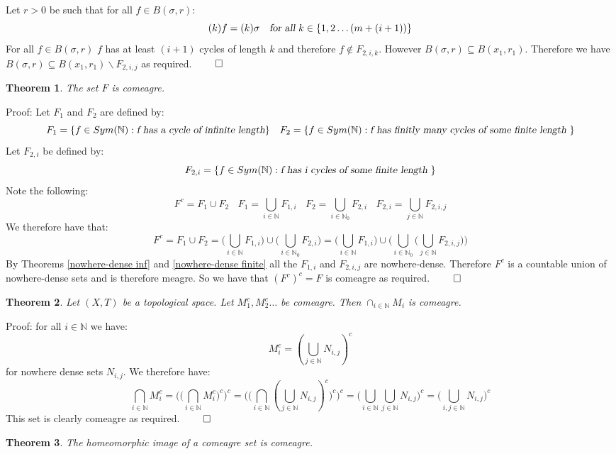 \documentclass{report}
\newtheorem{theorem}{Theorem}[section]
\begin{document}
Let $r>0$ be such that for all $f \in B(\sigma, r)$:
$$(k)f=(k)\sigma\ \ \textsl{ for all } k \in \{1,2\ldots (m+(i+1))\}$$
For all $f\in B(\sigma, r)$ $f$ has at least $(i+1)$ cycles of length $k$ and therefore $f\notin F_{2,i,k}$. However $B(\sigma, r) \subseteq B(x_1,r_1)$.
Therefore we have $B(\sigma,r)\subseteq B(x_1,r_1)\backslash F_{2,i,j}$ as required. $\qed$
\begin{theorem}\label{F is comeagre}
The set $F$ is comeagre.
\end{theorem}\par
Proof: Let $F_1$ and $F_2$ are defined by:
\[F_1 = \{f \in Sym(\mathbb{N}): \textsl{f has a cycle of infinite length}\}\ \ \ F_2 = \{f \in Sym(\mathbb{N}): \textsl{f has finitly many cycles of some finite length }\}\]
Let $F_{2,i}$ be defined by:
$$F_{2,i} = \{f \in Sym(\mathbb{N}): \textsl{f has i cycles of some finite length }\}$$
Note the following:
\[F^c = F_1 \cup F_2 \ \ \ \ F_1 = \bigcup_{i \in \mathbb{N}}F_{1,i}\ \ \ \ F_2 = \bigcup_{i \in \mathbb{N}_0}F_{2,i}\ \ \ \ F_{2,i}=\bigcup_{j \in \mathbb{N}}F_{2,i,j}\]
We therefore have that:
\[F^c = F_1 \cup F_2= \big(\bigcup_{i \in \mathbb{N}}F_{1,i}\big) \cup \big(\bigcup_{i \in \mathbb{N}_0}F_{2,i}\big)= \big(\bigcup_{i \in \mathbb{N}}F_{1,i}\big) \cup \big(\bigcup_{i \in \mathbb{N}_0}\big( \bigcup_{j \in \mathbb{N}}F_{2,i,j} \big)\big)\]
By Theorems \ref{nowhere-dense inf} and \ref{nowhere-dense finite} all the $F_{1,i}$ and $F_{2,i,j}$ are nowhere-dense. Therefore $F^c$ is a countable union of nowhere-dense sets and is therefore meagre. So we have that $(F^c)^c = F$ is comeagre as required.
$\qed$
\begin{theorem}\label{comeagre intersection}
Let $(X,T)$ be a topological space. Let $M_1^c, M_2^c \ldots$ be comeagre. Then $\cap_{i \in \mathbb{N}}M_i$ is comeagre.
\end{theorem}\par
Proof: for all $i \in \mathbb{N}$ we have:
$$M_i^c = (\bigcup_{j \in \mathbb{N}}{N_{i,j}})^c$$
for nowhere dense sets $N_{i,j}$.
We therefore have:
\[\bigcap_{i\in \mathbb{N}}{M_i^c}=\big(\big(\bigcap_{i\in \mathbb{N}}{M_i^c}\big)^c\big)^c=\big(\big(\bigcap_{i\in \mathbb{N}}{(\bigcup_{j \in \mathbb{N}}{N_{i,j}})^c}\big)^c\big)^c=\big(\bigcup_{i\in \mathbb{N}}{\bigcup_{j \in \mathbb{N}}{N_{i,j}}}\big)^c=\big(\bigcup_{i,j\in \mathbb{N}}{N_{i,j}}\big)^c\]
This set is clearly comeagre as required. $\qed$
\begin{theorem}\label{comeagre image}
The homeomorphic image of a comeagre set is comeagre.
\end{theorem}\par
\end{document}
